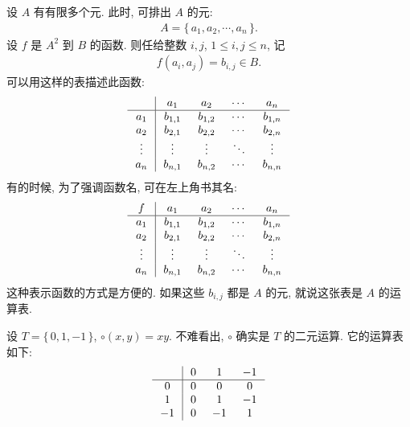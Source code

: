 \begin{remark}
    设 $A$ 有有限多个元. 此时, 可排出 $A$ 的元:
    \begin{align*}
        A = \{\, a_1, a_2, \cdots, a_n \,\}.
    \end{align*}
    设 $f$ 是 $A^2$ 到 $B$ 的函数. 则任给整数 $i,j$, $1 \leq i,j \leq n$, 记
    \begin{align*}
        f(a_i, a_j) = b_{i,j} \in B.
    \end{align*}
    可以用这样的表描述此函数:
    \begin{align*}
        \arraycolsep=0.25cm
        \begin{array}{c|cccc}
            \      & a_1     & a_2     & \cdots & a_n     \\ \hline
            a_1    & b_{1,1} & b_{1,2} & \cdots & b_{1,n} \\
            a_2    & b_{2,1} & b_{2,2} & \cdots & b_{2,n} \\
            \vdots & \vdots  & \vdots  & \ddots & \vdots  \\
            a_n    & b_{n,1} & b_{n,2} & \cdots & b_{n,n} \\
        \end{array}
    \end{align*}
    有的时候, 为了强调函数名, 可在左上角书其名:
    \begin{align*}
        \arraycolsep=0.25cm
        \begin{array}{c|cccc}
            f      & a_1     & a_2     & \cdots & a_n     \\ \hline
            a_1    & b_{1,1} & b_{1,2} & \cdots & b_{1,n} \\
            a_2    & b_{2,1} & b_{2,2} & \cdots & b_{2,n} \\
            \vdots & \vdots  & \vdots  & \ddots & \vdots  \\
            a_n    & b_{n,1} & b_{n,2} & \cdots & b_{n,n} \\
        \end{array}
    \end{align*}
    这种表示函数的方式是方便的. 如果这些 $b_{i,j}$ 都是 $A$ 的元, 就说这张表是 $A$ 的运算表.
\end{remark}

\begin{example}
    设 $T = \{\, 0,1,-1 \,\}$, $\circ (x,y) = xy$. 不难看出, $\circ$ 确实是 $T$ 的二元运算. 它的运算表如下:
    \begin{align*}
        \arraycolsep=0.25cm
        \begin{array}{c|ccc}
            \  & 0 & 1  & -1 \\ \hline
            0  & 0 & 0  & 0  \\
            1  & 0 & 1  & -1 \\
            -1 & 0 & -1 & 1  \\
        \end{array}
    \end{align*}
\end{example}

